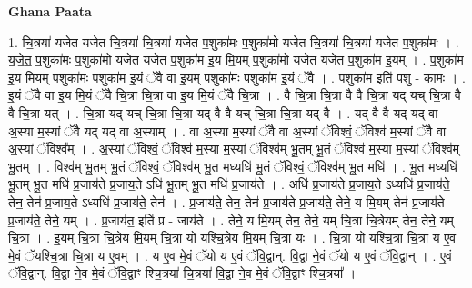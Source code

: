 \documentclass[17pt]{extarticle}
\begin{document}
\textbf{Ghana Paata } \newline

1. चि॒त्रया॑ यजेत यजेत चि॒त्रया॑ चि॒त्रया॑ यजेत प॒शुका॑मः प॒शुका॑मो यजेत चि॒त्रया॑ चि॒त्रया॑ यजेत प॒शुका॑मः । . य॒जे॒त॒ प॒शुका॑मः प॒शुका॑मो यजेत यजेत प॒शुका॑म इ॒य मि॒यम् प॒शुका॑मो यजेत यजेत प॒शुका॑म इ॒यम् । . प॒शुका॑म इ॒य मि॒यम् प॒शुका॑मः प॒शुका॑म इ॒यं ॅवै वा इ॒यम् प॒शुका॑मः प॒शुका॑म इ॒यं ॅवै । . प॒शुका॑म॒ इति॑ प॒शु - का॒मः॒ । . इ॒यं ॅवै वा इ॒य मि॒यं ॅवै चि॒त्रा चि॒त्रा वा इ॒य मि॒यं ॅवै चि॒त्रा । . वै चि॒त्रा चि॒त्रा वै वै चि॒त्रा यद् यच् चि॒त्रा वै वै चि॒त्रा यत् । . चि॒त्रा यद् यच् चि॒त्रा चि॒त्रा यद् वै वै यच् चि॒त्रा चि॒त्रा यद् वै । . यद् वै वै यद् यद् वा अ॒स्या म॒स्यां ॅवै यद् यद् वा अ॒स्याम् । . वा अ॒स्या म॒स्यां ॅवै वा अ॒स्यां ॅविश्वं॒ ॅविश्व॑ म॒स्यां ॅवै वा अ॒स्यां ॅविश्व᳚म् । . अ॒स्यां ॅविश्वं॒ ॅविश्व॑ म॒स्या म॒स्यां ॅविश्व॑म् भू॒तम् भू॒तं ॅविश्व॑ म॒स्या म॒स्यां ॅविश्व॑म् भू॒तम् । . विश्व॑म् भू॒तम् भू॒तं ॅविश्वं॒ ॅविश्व॑म् भू॒त मध्यधि॑ भू॒तं ॅविश्वं॒ ॅविश्व॑म् भू॒त मधि॑ । . भू॒त मध्यधि॑ भू॒तम् भू॒त मधि॑ प्र॒जाय॑ते प्र॒जाय॒ते ऽधि॑ भू॒तम् भू॒त मधि॑ प्र॒जाय॑ते । . अधि॑ प्र॒जाय॑ते प्र॒जाय॒ते ऽध्यधि॑ प्र॒जाय॑ते॒ तेन॒ तेन॑ प्र॒जाय॒ते ऽध्यधि॑ प्र॒जाय॑ते॒ तेन॑ । . प्र॒जाय॑ते॒ तेन॒ तेन॑ प्र॒जाय॑ते प्र॒जाय॑ते॒ तेने॒ य मि॒यम् तेन॑ प्र॒जाय॑ते प्र॒जाय॑ते॒ तेने॒ यम् । . प्र॒जाय॑त॒ इति॑ प्र - जाय॑ते । . तेने॒ य मि॒यम् तेन॒ तेने॒ यम् चि॒त्रा चि॒त्रेयम् तेन॒ तेने॒ यम् चि॒त्रा । . इ॒यम् चि॒त्रा चि॒त्रेय मि॒यम् चि॒त्रा यो यश्चि॒त्रेय मि॒यम् चि॒त्रा यः । . चि॒त्रा यो यश्चि॒त्रा चि॒त्रा य ए॒व मे॒वं ॅयश्चि॒त्रा चि॒त्रा य ए॒वम् । . य ए॒व मे॒वं ॅयो य ए॒वं ॅवि॒द्वान्. वि॒द्वा ने॒वं ॅयो य ए॒वं ॅवि॒द्वान् । . ए॒वं ॅवि॒द्वान्. वि॒द्वा ने॒व मे॒वं ॅवि॒द्वाꣳ श्चि॒त्रया॑ चि॒त्रया॑ वि॒द्वा ने॒व मे॒वं ॅवि॒द्वाꣳ श्चि॒त्रया᳚ । \newline
\end{document}
